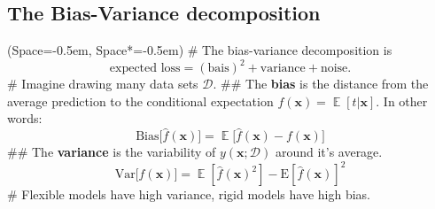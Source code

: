 \documentclass[12pt, a4paper]{article}
\newcommand{\listSpace}{-0.5em}%
\newcommand{\D}{\mathcal{D}}
\newcommand{\vect}[1]{\bm{#1}}
\DeclareMathOperator{\E}{\mathbb{E}}
\begin{document}
\subsection*{The Bias-Variance decomposition}
\begin{easylist}[itemize]
	\ListProperties(Space=\listSpace, Space*=\listSpace)
	# The bias-variance decomposition is
	\begin{equation*}
	\text{expected loss} = (\text{bais})^2 + \text{variance} + \text{noise}.
	\end{equation*}
	# Imagine drawing many data sets $\D$.
	## The \textbf{bias} is the distance from the average prediction to the conditional expectation $f(\vect{x}) = \E \left[t | \vect{x} \right]$.
	In other words:
	\begin{equation*}
		\mathrm{Bias}\big[\hat{f}(\vect{x})\big] = \E \big[\hat{f}(\vect{x}) - f(\vect{x})\big]
	\end{equation*}
	## The \textbf{variance} is the variability of $y(\vect{x}; \D)$ around it's average.
	\begin{equation*}
		\mathrm{Var}\big[\hat{f}(\vect{x})\big] = \E [\hat{f}(\vect{x})^2] - \mathrm{E}[{\hat{f}}(\vect{x})]^2
	\end{equation*}
	# Flexible models have high variance, rigid models have high bias.
\end{easylist}
\end{document}
